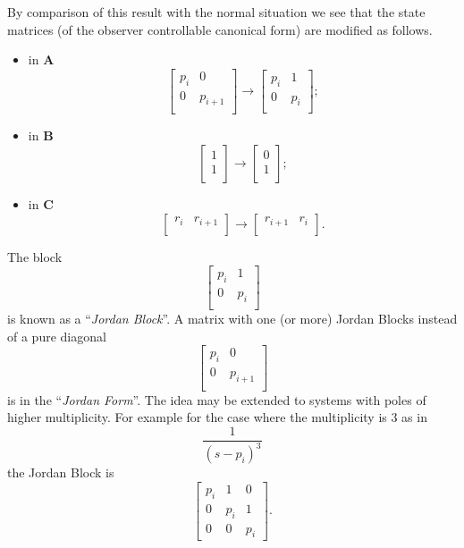 By comparison of this result with the normal situation we see that
the state matrices (of the observer controllable canonical form)
are modified as follows.
\begin{itemize}
  \item in $\mathbf{A}$ \[\left[\begin{array}{cc}
    p_i & 0 \\
    0 & p_{i+1} \\
  \end{array}\right] \rightarrow \left[\begin{array}{cc}
    p_i & 1 \\
    0 & p_{i} \\
  \end{array}\right];\]
  \item in $\mathbf{B}$ \[\left[\begin{array}{c}
    1 \\
    1  \\
  \end{array}\right] \rightarrow \left[\begin{array}{c}
    0 \\
    1 \\
  \end{array}\right];\]
    \item in $\mathbf{C}$ \[\left[\begin{array}{cc}
    r_i & r_{i+1}\\
  \end{array}\right] \rightarrow \left[\begin{array}{cc}
    r_{i+1} & r_i\\
  \end{array}\right].\]

\end{itemize}

The block \[\left[\begin{array}{cc}
    p_i & 1 \\
    0 & p_{i} \\
  \end{array}\right]\] is known as a ``\emph{Jordan Block}''. A
  matrix with one (or more) Jordan Blocks instead of a pure diagonal \[\left[\begin{array}{cc}
    p_i & 0 \\
    0 & p_{i+1} \\
  \end{array}\right]\] is in the ``\emph{Jordan Form}''. The idea
  may be extended to systems with poles of higher multiplicity.
  For example for the case where the multiplicity is 3 as in
  \[\frac{1}{(s-p_i)^3}\] the Jordan Block is  \[\left[\begin{array}{ccc}
    p_i & 1 & 0 \\
    0 & p_{i} & 1 \\
    0 & 0 & p_i
  \end{array}\right].\]

